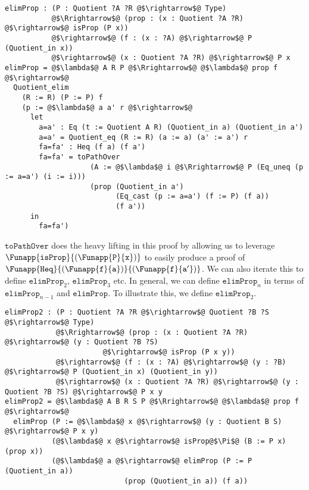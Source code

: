 \documentclass[12pt,twoside,maitrise]{dms}
\theoremstyle{definition}
\numberwithin{equation}{section}
\numberwithin{table}{chapter}
\numberwithin{figure}{chapter}
\newcommand\id[1] {\texttt{#1}}
\newcommand\fn[1] {\texttt{#1}}
\begin{document}
\begin{verbatim}
elimProp : (P : Quotient ?A ?R @$\rightarrow$@ Type)
           @$\Rrightarrow$@ (prop : (x : Quotient ?A ?R) @$\rightarrow$@ isProp (P x))
           @$\rightarrow$@ (f : (x : ?A) @$\rightarrow$@ P (Quotient_in x))
           @$\rightarrow$@ (x : Quotient ?A ?R) @$\rightarrow$@ P x
elimProp = @$\lambda$@ A R P @$\Rrightarrow$@ @$\lambda$@ prop f @$\rightarrow$@
  Quotient_elim
    (R := R) (P := P) f
    (p := @$\lambda$@ a a' r @$\rightarrow$@
      let
        a=a' : Eq (t := Quotient A R) (Quotient_in a) (Quotient_in a')
        a=a' = Quotient_eq (R := R) (a := a) (a' := a') r
        fa=fa' : Heq (f a) (f a')
        fa=fa' = toPathOver
                    (A := @$\lambda$@ i @$\Rrightarrow$@ P (Eq_uneq (p := a=a') (i := i)))
                    (prop (Quotient_in a')
                          (Eq_cast (p := a=a') (f := P) (f a))
                          (f a'))
      in
        fa=fa')
\end{verbatim}

$\fn{toPathOver}$ does the heavy lifting in this proof by allowing us to leverage $\Funapp{\fn{isProp}}{(\Funapp{\id{P}}{\id{x}})}$ to easily produce a proof of $\Funapp{\id{Heq}}{(\Funapp{\id{f}}{\id{a}})}{(\Funapp{\id{f}}{\id{a}'})}$. We can also iterate this to define $\fn{elimProp}_2$, $\fn{elimProp}_3$ etc. In general, we can define $\fn{elimProp}_n$ in terms of $\fn{elimProp}_{n-1}$ and $\fn{elimProp}$. To illustrate this, we define $\fn{elimProp}_2$.

\begin{verbatim}
elimProp2 : (P : Quotient ?A ?R @$\rightarrow$@ Quotient ?B ?S @$\rightarrow$@ Type)
            @$\Rrightarrow$@ (prop : (x : Quotient ?A ?R) @$\rightarrow$@ (y : Quotient ?B ?S)
                       @$\rightarrow$@ isProp (P x y))
            @$\rightarrow$@ (f : (x : ?A) @$\rightarrow$@ (y : ?B) @$\rightarrow$@ P (Quotient_in x) (Quotient_in y))
            @$\rightarrow$@ (x : Quotient ?A ?R) @$\rightarrow$@ (y : Quotient ?B ?S) @$\rightarrow$@ P x y
elimProp2 = @$\lambda$@ A B R S P @$\Rrightarrow$@ @$\lambda$@ prop f @$\rightarrow$@
  elimProp (P := @$\lambda$@ x @$\rightarrow$@ (y : Quotient B S) @$\rightarrow$@ P x y)
           (@$\lambda$@ x @$\rightarrow$@ isProp@$\Pi$@ (B := P x) (prop x))
           (@$\lambda$@ a @$\rightarrow$@ elimProp (P := P (Quotient_in a))
                            (prop (Quotient_in a)) (f a))
\end{verbatim}
\end{document}
